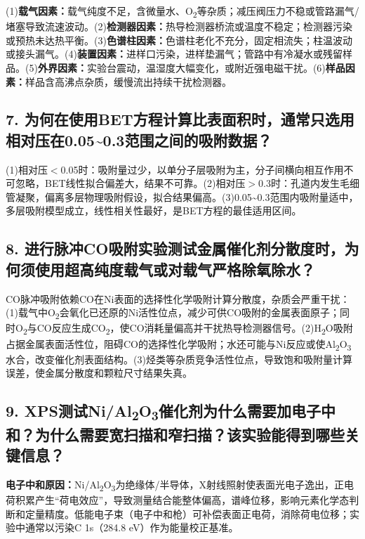\documentclass[a4paper]{article}
\begin{document}
(1)\textbf{载气因素：}载气纯度不足，含微量水、O\textsubscript{2}等杂质；减压阀压力不稳或管路漏气/堵塞导致流速波动。(2)\textbf{检测器因素：}热导检测器桥流或温度不稳定；检测器污染或预热未达热平衡。(3)\textbf{色谱柱因素：}色谱柱老化不充分，固定相流失；柱温波动或接头漏气。(4)\textbf{装置因素：}进样口污染，进样垫漏气；管路中有冷凝水或残留样品。(5)\textbf{外界因素：}实验台震动，温湿度大幅变化，或附近强电磁干扰。(6)\textbf{样品因素：}样品含高沸点杂质，缓慢流出持续干扰检测器。

\subsection*{7. 为何在使用BET方程计算比表面积时，通常只选用相对压在0.05\textasciitilde{}0.3范围之间的吸附数据？}

(1)相对压$<$0.05时：吸附量过少，以单分子层吸附为主，分子间横向相互作用不可忽略，BET线性拟合偏差大，结果不可靠。(2)相对压$>$0.3时：孔道内发生毛细管凝聚，偏离多层物理吸附假设，拟合结果偏高。(3)0.05\textasciitilde{}0.3范围内吸附量适中，多层吸附模型成立，线性相关性最好，是BET方程的最佳适用区间。

\subsection*{8. 进行脉冲CO吸附实验测试金属催化剂分散度时，为何须使用超高纯度载气或对载气严格除氧除水？}

CO脉冲吸附依赖CO在Ni表面的选择性化学吸附计算分散度，杂质会严重干扰：(1)载气中O\textsubscript{2}会氧化已还原的Ni活性位点，减少可供CO吸附的金属表面原子；同时O\textsubscript{2}与CO反应生成CO\textsubscript{2}，使CO消耗量偏高并干扰热导检测器信号。(2)H\textsubscript{2}O吸附占据金属表面活性位，阻碍CO的选择性化学吸附；水还可能与Ni反应或使Al\textsubscript{2}O\textsubscript{3}水合，改变催化剂表面结构。(3)烃类等杂质竞争活性位点，导致饱和吸附量计算误差，使金属分散度和颗粒尺寸结果失真。

\subsection*{9. XPS测试Ni/Al\textsubscript{2}O\textsubscript{3}催化剂为什么需要加电子中和？为什么需要宽扫描和窄扫描？该实验能得到哪些关键信息？}

\textbf{电子中和原因：}Ni/Al\textsubscript{2}O\textsubscript{3}为绝缘体/半导体，X射线照射使表面光电子逸出，正电荷积累产生“荷电效应”，导致测量结合能整体偏高，谱峰位移，影响元素化学态判断和定量精度。低能电子束（电子中和枪）可补偿表面正电荷，消除荷电位移；实验中通常以污染C 1s（284.8 eV）作为能量校正基准。
\end{document}
